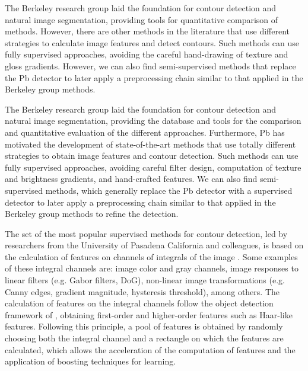 The Berkeley research group laid the foundation for contour detection and natural image segmentation, providing tools for quantitative comparison of methods. However, there are other methods in the literature that use different strategies to calculate image features and detect contours. Such methods can use fully supervised approaches, avoiding the careful hand-drawing of texture and gloss gradients. However, we can also find semi-supervised methods that replace the Pb detector to later apply a preprocessing chain similar to that applied in the Berkeley group methods.

The Berkeley research group laid the foundation for contour detection and natural image segmentation, providing the database and tools for the comparison and quantitative evaluation of the different approaches. Furthermore, Pb has motivated the development of state-of-the-art methods that use totally different strategies to obtain image features and contour detection. Such methods can use fully supervised approaches, avoiding careful filter design, computation of texture and brightness gradients, and hand-crafted features. We can also find semi-supervised methods, which generally replace the Pb detector with a supervised detector to later apply a preprocessing chain similar to that applied in the Berkeley group methods to refine the detection.

The set of the most popular supervised methods for contour detection, led by researchers from the University of Pasadena California and colleagues, is based on the calculation of features on channels of integrals of the image \citep{Dollar.Tu.ea:BMVC:2009}. Some examples of these integral channels are: image color and gray channels, image responses to linear filters (e.g. Gabor filters, DoG), non-linear image transformations (e.g. Canny edges, gradient magnitude, hysteresis threshold), among others. The calculation of features on the integral channels follow the object detection framework of \cite{Viola.Jones:IJCV:2004}, obtaining first-order and higher-order features such as Haar-like features. Following this principle, a pool of features is obtained by randomly choosing both the integral channel and a rectangle on which the features are calculated, which allows the acceleration of the computation of features and the application of boosting techniques for learning.

